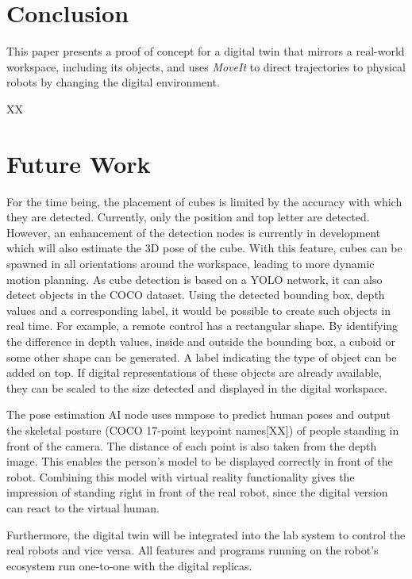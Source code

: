 \documentclass{bmvc2k}
\begin{document}
\section{Conclusion}
\label{sec:conclusion}
This paper presents a proof of concept for a digital twin that mirrors a real-world workspace, including its objects, and uses \textit{MoveIt} to direct trajectories to physical robots by changing the digital environment.

XX


\section{Future Work}
\label{sec:future}
For the time being, the placement of cubes is limited by the accuracy with which they are detected. Currently, only the position and top letter are detected. However, an enhancement of the detection nodes is currently in development which will also estimate the 3D pose of the cube. With this feature, cubes can be spawned in all orientations around the workspace, leading to more dynamic motion planning. As cube detection is based on a YOLO network, it can also detect objects in the COCO dataset. Using the detected bounding box, depth values and a corresponding label, it would be possible to create such objects in real time. For example, a remote control has a rectangular shape. By identifying the difference in depth values, inside and outside the bounding box, a cuboid or some other shape can be generated. A label indicating the type of object can be added on top. If digital representations of these objects are already available, they can be scaled to the size detected and displayed in the digital workspace.

The pose estimation AI node uses mmpose to predict human poses and output the skeletal posture (COCO 17-point keypoint names[XX]) of people standing in front of the camera. The distance of each point is also taken from the depth image. This enables the person's model to be displayed correctly in front of the robot. Combining this model with virtual reality functionality gives the impression of standing right in front of the real robot, since the digital version can react to the virtual human.

Furthermore, the digital twin will be integrated into the lab system to control the real robots and vice versa. All features and programs running on the robot's ecosystem run one-to-one with the digital replicas.


\end{document}
